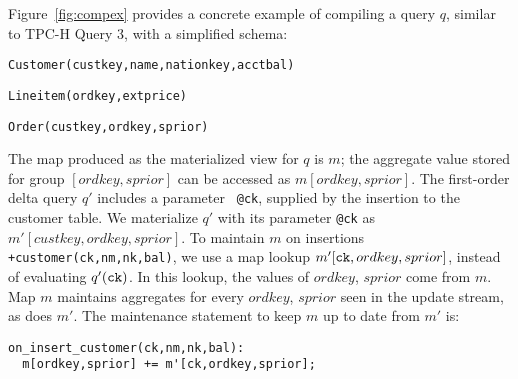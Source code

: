Figure~\ref{fig:compex} provides a concrete example of compiling a query $q$,
similar to TPC-H Query 3, with a simplified schema:

\texttt{Customer(custkey,name,nationkey,acctbal)}

\texttt{Lineitem(ordkey,extprice)}

\texttt{Order(custkey,ordkey,sprior)}

\noindent The map produced as the materialized view for $q$ is $m$; the
aggregate value stored for group $[ordkey,sprior]$ can be accessed as
$m[ordkey,sprior]$. The first-order delta query $q'$ includes a parameter {\tt
@ck}, supplied by the insertion to the customer table. We materialize $q'$ with
its parameter {\tt @ck} as $m'[custkey,ordkey,sprior]$. To maintain $m$ on
insertions {\tt +customer(ck,nm,nk,bal)}, we use a map lookup $m'[\mbox{{\tt
ck}},ordkey,sprior]$, instead of evaluating $q'(\mbox{{\tt ck}})$. In this
lookup, the values of $ordkey$, $sprior$ come from $m$. Map $m$ maintains
aggregates for every $ordkey$, $sprior$ seen in the update stream, as does $m'$.
The maintenance statement to keep $m$ up to date from $m'$ is:


{\footnotesize
\begin{verbatim}
on_insert_customer(ck,nm,nk,bal):
  m[ordkey,sprior] += m'[ck,ordkey,sprior];
\end{verbatim}
}

